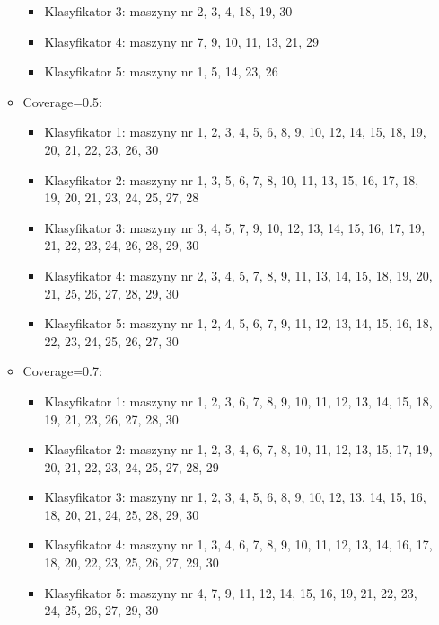\documentclass[polish,12pt]{aghthesis}
\begin{document}
\begin{itemize}
\begin{itemize}
\begin{itemize}
            \item Klasyfikator 3: maszyny nr 2, 3, 4, 18, 19, 30
            \item Klasyfikator 4: maszyny nr 7, 9, 10, 11, 13, 21, 29
            \item Klasyfikator 5: maszyny nr 1, 5, 14, 23, 26
        \end{itemize}
        \item Coverage=0.5:
        \begin{itemize}
            \item Klasyfikator 1: maszyny nr 1, 2, 3, 4, 5, 6, 8, 9, 10, 12, 14, 15, 18, 19, 20, 21, 22, 23, 26, 30
            \item Klasyfikator 2: maszyny nr 1, 3, 5, 6, 7, 8, 10, 11, 13, 15, 16, 17, 18, 19, 20, 21, 23, 24, 25, 27, 28
            \item Klasyfikator 3: maszyny nr 3, 4, 5, 7, 9, 10, 12, 13, 14, 15, 16, 17, 19, 21, 22, 23, 24, 26, 28, 29, 30
            \item Klasyfikator 4: maszyny nr 2, 3, 4, 5, 7, 8, 9, 11, 13, 14, 15, 18, 19, 20, 21, 25, 26, 27, 28, 29, 30
            \item Klasyfikator 5: maszyny nr 1, 2, 4, 5, 6, 7, 9, 11, 12, 13, 14, 15, 16, 18, 22, 23, 24, 25, 26, 27, 30
        \end{itemize}
        \item Coverage=0.7:
        \begin{itemize}
            \item Klasyfikator 1: maszyny nr 1, 2, 3, 6, 7, 8, 9, 10, 11, 12, 13, 14, 15, 18, 19, 21, 23, 26, 27, 28, 30
            \item Klasyfikator 2: maszyny nr 1, 2, 3, 4, 6, 7, 8, 10, 11, 12, 13, 15, 17, 19, 20, 21, 22, 23, 24, 25, 27, 28, 29
            \item Klasyfikator 3: maszyny nr 1, 2, 3, 4, 5, 6, 8, 9, 10, 12, 13, 14, 15, 16, 18, 20, 21, 24, 25, 28, 29, 30
            \item Klasyfikator 4: maszyny nr 1, 3, 4, 6, 7, 8, 9, 10, 11, 12, 13, 14, 16, 17, 18, 20, 22, 23, 25, 26, 27, 29, 30
            \item Klasyfikator 5: maszyny nr 4, 7, 9, 11, 12, 14, 15, 16, 19, 21, 22, 23, 24, 25, 26, 27, 29, 30
        \end{itemize}
    \end{itemize}
\end{itemize}
\end{document}
